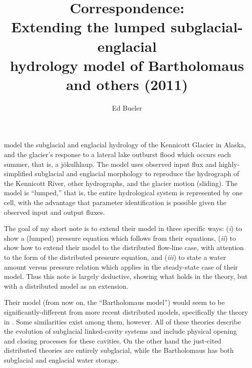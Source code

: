 \documentclass[twocolumn]{igs}
\begin{document}
\title[Correspondence: Extending the Bartholomaus hydrology model]{Correspondence: \\ Extending the lumped subglacial-englacial \\ hydrology model of Bartholomaus and others (2011)}

\author{Ed Bueler}



\maketitle

\cite{Bartholomausetal2011} model the subglacial and englacial hydrology of the Kennicott Glacier in Alaska, and the glacier's response to a lateral lake outburst flood which occurs each summer, that is, a j\"okulhlaup.  The model uses observed input flux and highly-simplified subglacial and englacial morphology to reproduce the hydrograph of the Kennicott River, other hydrographs, and the glacier motion (sliding).  The model is ``lumped,'' that is, the entire hydrological system is represented by one cell, with the advantage that parameter identification is possible given the observed input and output fluxes.

The goal of my short note is to extend their model in three specific ways: (\emph{i}) to show a (lumped) pressure equation which follows from their equations, (\emph{ii}) to show how to extend their model to the distributed flow-line case, with attention to the form of the distributed pressure equation, and (\emph{iii}) to state a water amount versus pressure relation which applies in the steady-state case of their model.  Thus this note is largely deductive, showing what holds in the \cite{Bartholomausetal2011} theory, but with a distributed model as an extension.

Their model (from now on, the ``Bartholomaus model'') would seem to be significantly-different from more recent distributed models, specifically the theory in \citep{Hewitt2011,Schoofetal2012,Hewittetal2012}.  Some similarities exist among them, however.  All of these theories describe the evolution of subglacial linked-cavity systems and include physical opening and closing processes for these cavities.  On the other hand the just-cited distributed theories are entirely subglacial, while the Bartholomaus has both subglacial and englacial water storage.  
\end{document}
